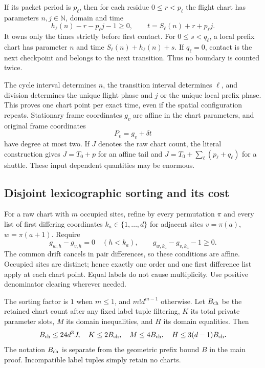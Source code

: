 \documentclass[11pt,letterpaper]{article}
\numberwithin{equation}{section}
\theoremstyle{definition}
\theoremstyle{remark}
\newcommand{\NN}{\mathbb N}
\begin{document}
If its packet period is $p_\ell$, then for each residue $0\le r<p_\ell$ the flight chart has parameters $n,j\in\NN$, domain and time
\begin{equation}\label{smc:zd:eq:halfopen}
 h_\ell(n)-r-p_\ell j-1\ge0,\qquad
 t=S_\ell(n)+r+p_\ell j.
\end{equation}
It owns only the times strictly before first contact. For $0\le s<q_\ell$, a local prefix chart has parameter $n$ and time $S_\ell(n)+h_\ell(n)+s$. If $q_\ell=0$, contact is the next checkpoint and belongs to the next transition. Thus no boundary is counted twice.

The cycle interval determines $n$, the transition interval determines $\ell$, and division determines the unique flight phase and $j$ or the unique local prefix phase. This proves one chart point per exact time, even if the spatial configuration repeats. Stationary frame coordinates $g_v$ are affine in the chart parameters, and original frame coordinates
\[
 P_v=g_v+\delta t
\]
have degree at most two. If $J$ denotes the raw chart count, the literal construction gives $J=T_0+p$ for an affine tail and $J=T_0+\sum_\ell(p_\ell+q_\ell)$ for a shuttle. These input dependent quantities may be enormous.

\subsection{Disjoint lexicographic sorting and its cost}
For a raw chart with $m$ occupied sites, refine by every permutation $\pi$ and every list of first differing coordinates $k_a\in\{1,\ldots,d\}$ for adjacent sites $v=\pi(a)$, $w=\pi(a+1)$. Require
\[
 g_{w,h}-g_{v,h}=0\quad(h<k_a),\qquad
 g_{w,k_a}-g_{v,k_a}-1\ge0.
\]
The common drift cancels in pair differences, so these conditions are affine. Occupied sites are distinct; hence exactly one order and one first difference list apply at each chart point. Equal labels do not cause multiplicity. Use positive denominator clearing wherever needed.

The sorting factor is $1$ when $m\le1$, and $m!d^{m-1}$ otherwise. Let $B_{\rm ch}$ be the retained chart count after any fixed label tuple filtering, $K$ its total private parameter slots, $M$ its domain inequalities, and $H$ its domain equalities. Then
\begin{equation}\label{smc:zd:eq:chartcounts}
 B_{\rm ch}\le24d^3J,\quad K\le2B_{\rm ch},\quad
 M\le4B_{\rm ch},\quad H\le3(d-1)B_{\rm ch}.
\end{equation}
The notation $B_{\rm ch}$ is separate from the geometric prefix bound $B$ in the main proof. Incompatible label tuples simply retain no charts.
\end{document}
